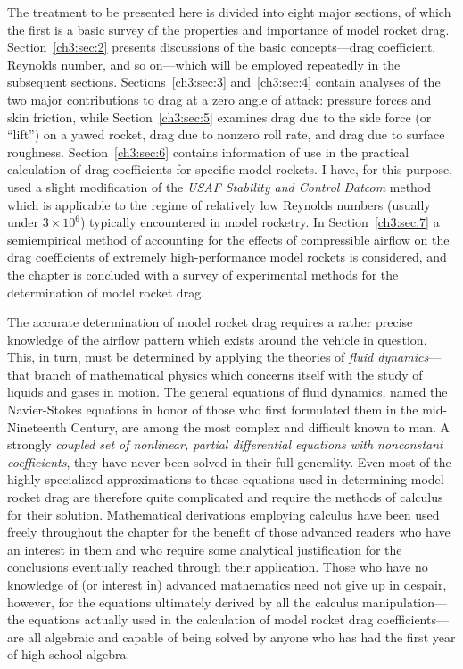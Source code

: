 The treatment to be presented here is divided into eight major sections, of
which the first is a basic survey of the properties and importance of model
rocket drag. Section~\ref{ch3:sec:2} presents discussions of the basic
concepts---drag coefficient, Reynolds number, and so on---which will be
employed repeatedly in the subsequent sections. Sections~\ref{ch3:sec:3}
and~\ref{ch3:sec:4} contain analyses of the two major contributions to drag at
a zero angle of attack: pressure forces and skin friction, while
Section~\ref{ch3:sec:5} examines drag due to the side force (or ``lift'') on a
yawed rocket, drag due to nonzero roll rate, and drag due to surface
roughness. Section~\ref{ch3:sec:6} contains information of use in the practical
calculation of drag coefficients for specific model rockets. I have, for this
purpose, used a slight modification of the \emph{USAF Stability and Control
Datcom} method which is applicable to the regime of relatively low Reynolds
numbers (usually under $3 \times 10^{6}$) typically encountered in model
rocketry. In Section~\ref{ch3:sec:7} a semiempirical method of accounting for
the effects of compressible airflow on the drag coefficients of extremely
high-performance model rockets is considered, and the chapter is concluded
with a survey of experimental methods for the determination of model rocket
drag.

The accurate determination of model rocket drag requires a rather precise
knowledge of the airflow pattern which exists around the vehicle in question.
This, in turn, must be determined by applying the theories of \emph{fluid
dynamics}---that branch of mathematical physics which concerns itself with the
study of liquids and gases in motion. The general equations of fluid dynamics,
named the Navier-Stokes equations in honor of those who first formulated them
in the mid-Nineteenth Century, are among the most complex and difficult known
to man. A strongly \emph{coupled set of nonlinear, partial differential
equations with nonconstant coefficients}, they have never been solved in their
full generality. Even most of the highly-specialized approximations to these
equations used in determining model rocket drag are therefore quite
complicated and require the methods of calculus for their solution.
Mathematical derivations employing calculus have been used freely throughout
the chapter for the benefit of those advanced readers who have an interest in
them and who require some analytical justification for the conclusions
eventually reached through their application. Those who have no knowledge of
(or interest in) advanced mathematics need not give up in despair, however,
for the equations ultimately derived by all the calculus manipulation---the
equations actually used in the calculation of model rocket drag
coefficients---are all algebraic and capable of being solved by anyone who has
had the first year of high school algebra.

